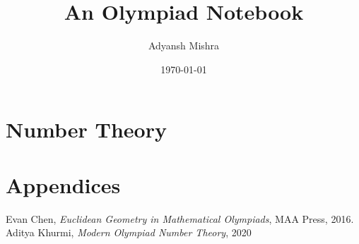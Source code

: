 \documentclass[twoside, a4paper, 10pt, bibliography=totoc, index=totoc, listof=totoc]{scrbook}
\begin{document}
    \author{Adyansh Mishra}
    \date{\today}
    \title{An Olympiad Notebook}
    \fncytitle

    \tableofcontents
     
    \frontmatter
    

    \mainmatter 
    \part{Number Theory}
    
    
    
    \appendix
    
    \part{Appendices}
    
    
    
    \backmatter
    \printindex
    \begin{thebibliography}{5}

          Evan Chen,
          \textit{Euclidean Geometry in Mathematical Olympiads},
          MAA Press,
          2016.
            Aditya Khurmi,
            \emph{Modern Olympiad Number Theory},
            2020
    \end{thebibliography}
\end{document}
